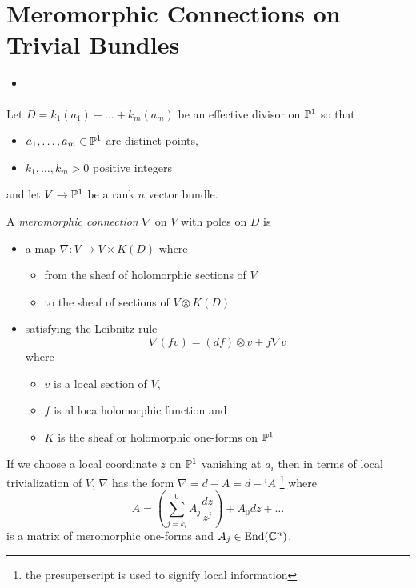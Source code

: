 
\section{Meromorphic Connections on Trivial Bundles}%
\begin{frame}
  {\Huge\insertsection{}}
  \begin{itemize}
    \item \cite{boalch}
  \end{itemize}
\end{frame}

\begin{frame}
Let $D=k_1(a_1)+\dots+k_m(a_m)$ be an effective divisor on $\P^1$ so that
\begin{itemize}
  \item $a_1,\dots,a_m\in\P^1$ are distinct points,
  \item $k_1,\dots,k_m>0$ positive integers
\end{itemize}
and let $V\to\P^1$ be a rank $n$ vector bundle.
\begin{defn}[2.1]
  A \emph{meromorphic connection} $\nabla$ on $V$ with poles on $D$ is
  \begin{itemize}
    \item a map $\nabla:V\to V\times K(D)$ where
      \begin{itemize}
        \item from the sheaf of holomorphic sections of $V$
        \item to the sheaf of sections of $V\otimes K(D)$
      \end{itemize}
    \item satisfying the Leibnitz rule
      \begin{equation}
        \nabla(fv)=(df)\otimes v + f\nabla v
      \end{equation}
      where
      \begin{itemize}
        \item $v$ is a local section of $V$,
        \item $f$ is al loca holomorphic function and
        \item $K$ is the sheaf or holomorphic one-forms on $\P^1$
      \end{itemize}
  \end{itemize}
\end{defn}
If we choose a local coordinate $z$ on $\P^1$ vanishing at $a_i$ then in terms
of local trivialization of $V$, $\nabla$ has the form
$\nabla=d-A=d-{}^iA$ \footnote{the presuperscript is used to signify local
information} where
\[
  A=\left(\sum^{0}_{j=k_i}A_j\frac{dz}{z^{j}}\right)+A_0dz+\dots
\]
is a matrix of meromorphic one-forms and $A_j\in\End(\C^n)$.
\end{frame}

